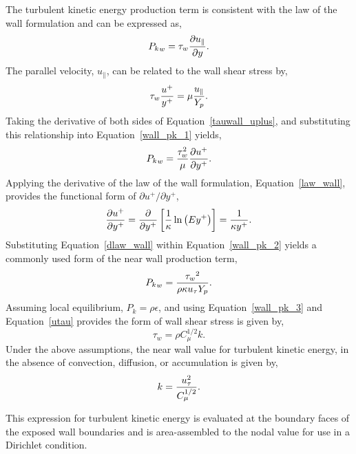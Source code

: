 The turbulent kinetic energy production term is consistent with the law of the wall formulation and can be expressed as,
%
\begin{equation}
        {P_k}_w = \tau_w {{\partial u_{\|}} \over {\partial y}}.
\label{wall_pk_1}
\end{equation}
%
The parallel velocity, $u_{\|}$, can be related to the wall shear stress by,
%
\begin{equation}
        \tau_w {u^+ \over y^+ } = \mu {u_{\|} \over Y_p }.
\label{tauwall_uplus}
\end{equation}
%
Taking the derivative of both sides of Equation~\ref{tauwall_uplus}, and
substituting this relationship into Equation~\ref{wall_pk_1} yields,
%
\begin{equation} 
        {P_k}_w = {\tau_w^2 \over \mu} {{\partial u^+} \over {\partial y^+}}.
\label{wall_pk_2}
\end{equation}
%
Applying the derivative of the law of the wall formulation, Equation~\ref{law_wall},
provides the functional form of ${\partial u^+ / \partial y^+}$,
%
\begin{equation} 
        {\partial u^+ \over \partial y^+}
      = {\partial \over \partial y^+}
       \left[{ 1 \over \kappa } \ln \left(Ey^+\right) \right]
      = {1 \over \kappa y^+}.
\label{dlaw_wall}
\end{equation}
%
Substituting Equation~\ref{dlaw_wall} within Equation~\ref{wall_pk_2} yields
a commonly used form of the near wall production term,
%
\begin{equation}
        {P_k}_w = {{\tau_w}^2 \over \rho\kappa u_{\tau} Y_p}.
\label{wall_pk_3}
\end{equation}
%
Assuming local equilibrium, $P_k = \rho\epsilon$, and using
Equation~\ref{wall_pk_3} and Equation~\ref{utau} provides the form 
of wall shear stress is given by,
%
\begin{equation}
        \tau_w = \rho C_\mu^{1/2} k.
\label{wall_tauw_equil}
\end{equation}
%
Under the above assumptions, the near wall value for turbulent kinetic 
energy, in the absence of convection, diffusion, or accumulation is given by,
%
\begin{equation}
   k = {{u_\tau^2} \over {C_\mu^{1/2}}}.
\label{wall_tke}
\end{equation}

This expression for turbulent kinetic energy is evaluated at the boundary faces of the
exposed wall boundaries and is area-assembled to the nodal value for use in a Dirichlet condition.


